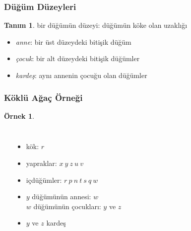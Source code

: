 \documentclass[dvipsnames]{beamer}
\theoremstyle{definition}
\newtheorem{tanim}[theorem]{Tanım}
\theoremstyle{example}
\newtheorem{ornek}[theorem]{Örnek}
\theoremstyle{plain}
\begin{document}
\begin{frame}
  \frametitle{Düğüm Düzeyleri}

  \begin{tanim}
    bir düğümün \alert{düzeyi}: düğümün köke olan uzaklığı
  \end{tanim}

  \begin{itemize}
    \item \emph{anne}: bir üst düzeydeki bitişik düğüm
    \item \emph{çocuk}: bir alt düzeydeki bitişik düğümler
    \item \emph{kardeş}: aynı annenin çocuğu olan düğümler
  \end{itemize}
\end{frame}

\begin{frame}
  \frametitle{Köklü Ağaç Örneği}

  \begin{ornek}
    \begin{columns}
      \begin{center}
      \end{center}

      \begin{itemize}
        \item kök: $r$
        \item yapraklar: $x ~ y ~ z ~ u ~ v$
        \item içdüğümler: $r ~ p ~ n ~ t ~ s ~ q ~ w$
        \item $y$ düğümünün annesi: $w$\\
          $w$ düğümünün çocukları: $y$ ve $z$\\
	\item $y$ ve $z$ kardeş
      \end{itemize}
    \end{columns}
  \end{ornek}
\end{frame}
\end{document}
